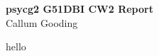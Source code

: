 \documentclass{report}
\begin{document}
	\begin{titlepage}
		\begin{center}
			\textbf{psycg2 G51DBI CW2 Report}\\
			\vspace{1cm}
			Callum Gooding
		\end{center}
	\end{titlepage}
	hello
\end{document}
